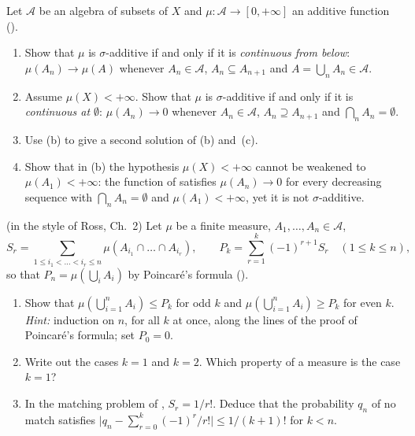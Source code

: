 \begin{exercise}\label{ex:ms-continuity-algebra}
\hard Let $\mathcal A$ be an algebra of subsets of $X$ and $\mu:\mathcal A\to[0,+\infty]$ an
additive function ().
\begin{enumerate}[label=(\alph*)]
  \item Show that $\mu$ is $\sigma$-additive if and only if it is \emph{continuous from below}:
    $\mu(A_n)\to\mu(A)$ whenever $A_n\in\mathcal A$, $A_n\subseteq A_{n+1}$ and
    $A=\bigcup_nA_n\in\mathcal A$.
  \item Assume $\mu(X)<+\infty$. Show that $\mu$ is $\sigma$-additive if and only if it is
    \emph{continuous at $\emptyset$}: $\mu(A_n)\to0$ whenever $A_n\in\mathcal A$,
    $A_n\supseteq A_{n+1}$ and $\bigcap_nA_n=\emptyset$.
  \item Use (b) to give a second solution of (b) and~(c).
  \item Show that in (b) the hypothesis $\mu(X)<+\infty$ cannot be weakened to
    $\mu(A_1)<+\infty$: the function of  satisfies
    $\mu(A_n)\to0$ for every decreasing sequence with $\bigcap_nA_n=\emptyset$ and
    $\mu(A_1)<+\infty$, yet it is not $\sigma$-additive.
\end{enumerate}
\end{exercise}

\begin{exercise}\label{ex:ms-bonferroni}
\medium (in the style of Ross, Ch.~2) Let $\mu$ be a finite measure, $A_1,\dots,A_n\in\mathcal A$,
\[
  S_r=\sum_{1\le i_1<\dots<i_r\le n}\mu(A_{i_1}\cap\dots\cap A_{i_r}),\qquad
  P_k=\sum_{r=1}^k(-1)^{r+1}S_r\quad(1\le k\le n),
\]
so that $P_n=\mu(\bigcup_iA_i)$ by Poincar\'e's formula ().
\begin{enumerate}[label=(\alph*)]
  \item Show that $\mu(\bigcup_{i=1}^nA_i)\le P_k$ for odd $k$ and $\mu(\bigcup_{i=1}^nA_i)\ge P_k$
    for even $k$. \emph{Hint:} induction on $n$, for all $k$ at once, along the lines of the
    proof of Poincar\'e's formula; set $P_0=0$.
  \item Write out the cases $k=1$ and $k=2$. Which property of a measure is the case $k=1$?
  \item In the matching problem of , $S_r=1/r!$. Deduce that the
    probability $q_n$ of no match satisfies
    $\big|q_n-\sum_{r=0}^k(-1)^r/r!\big|\le1/(k+1)!$ for $k<n$.
\end{enumerate}
\end{exercise}

